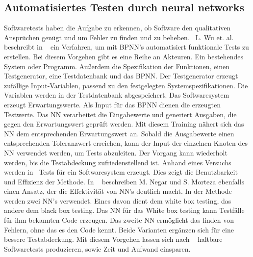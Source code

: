 \subsection{Automatisiertes Testen durch neural networks}
Softwaretests haben die Aufgabe zu erkennen, ob Software den qualitativen Ansprüchen genügt und um Fehler zu finden und zu beheben.~\cite{Wu2008}
L. Wu et. al. beschreibt in ~\cite{Wu2008} ein Verfahren, um mit BPNN's automatisiert funktionale Tests zu erstellen. 
Bei diesem Vorgehen gibt es eine Reihe an Akteuren. Ein bestehendes System oder Programm. Außerdem die Spezifikation der Funktionen, einen Testgenerator, eine Testdatenbank und das BPNN. Der Testgenerator erzeugt zufällige Input-Variablen, passend zu den festgelegten Systemspezifikationen. Die Variablen werden in der Testdatenbank abgespeichert. Das Softwaresystem erzeugt Erwartungswerte. Als Input für das BPNN dienen die erzeugten Testwerte. Das NN verarbeitet die Eingabewerte und generiert Ausgaben, die gegen den Erwartungswert geprüft werden.
Mit diesem Training nähert sich das NN dem entsprechenden Erwartungswert an.
Sobald die Ausgabewerte einen entsprechenden Toleranzwert erreichen, kann der Input der einzelnen Knoten des NN verwendet werden, um Tests abzuleiten. Der Vorgang kann wiederholt werden, bis die Testabdeckung zufriedenstellend ist. Anhand eines Versuchs werden in~\cite{Wu2008} Tests für ein Softwaresystem erzeugt. Dies zeigt die Benutzbarkeit und Effizienz der Methode.
\noindent In ~\cite{Majma2014} beschreiben M. Negar und S. Morteza ebenfalls einen Ansatz, der die Effektivität von NN's deutlich macht. In der Methode werden zwei NN's verwendet. Eines davon dient dem white box testing, das andere dem black box testing. Das NN für das White box testing kann Testfälle für ihm bekannten Code erzeugen. Das zweite NN ermöglicht das finden von Fehlern, ohne das es den Code  kennt. Beide Varianten ergänzen sich für eine bessere Testabdeckung. Mit diesem Vorgehen lassen sich nach ~\cite{Majma2014} haltbare Softwaretests produzieren, sowie Zeit und Aufwand einsparen.

